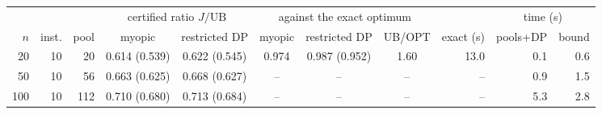 \begin{tabular}{rrrcccccrrr}
\toprule
& & & \multicolumn{2}{c}{certified ratio $J/\mathrm{UB}$} & \multicolumn{3}{c}{against the exact optimum} & & \multicolumn{2}{c}{time (s)} \\
\cmidrule(lr){4-5}\cmidrule(lr){6-8}\cmidrule(lr){10-11}
$n$ & inst. & pool & myopic & restricted DP & myopic & restricted DP & UB/OPT & exact (s) & pools+DP & bound \\
\midrule
20 & 10 & 20 & 0.614 (0.539) & 0.622 (0.545) & 0.974 & 0.987 (0.952) & 1.60 & 13.0 & 0.1 & 0.6 \\
50 & 10 & 56 & 0.663 (0.625) & 0.668 (0.627) & -- & -- & -- & -- & 0.9 & 1.5 \\
100 & 10 & 112 & 0.710 (0.680) & 0.713 (0.684) & -- & -- & -- & -- & 5.3 & 2.8 \\
\bottomrule
\end{tabular}